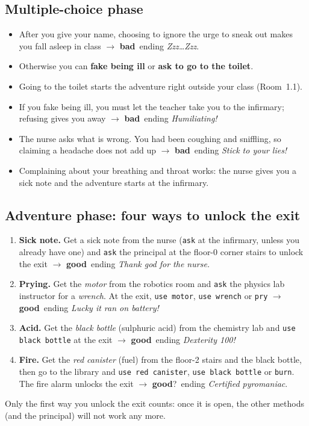 \documentclass[11pt, a4paper]{article}
\newcommand{\cmd}[1]{\texttt{#1}}
\newcommand{\good}{\textcolor{green!45!black}{\textbf{good}}}
\newcommand{\bad}{\textcolor{alarm}{\textbf{bad}}}
\begin{document}
\subsection*{Multiple-choice phase}
\begin{itemize}
  \item After you give your name, choosing to ignore the urge to sneak out makes you fall
        asleep in class $\to$ \bad\ ending \emph{Zzz\dots Zzz}.
  \item Otherwise you can \textbf{fake being ill} or \textbf{ask to go to the toilet}.
  \item Going to the toilet starts the adventure right outside your class (Room~1.1).
  \item If you fake being ill, you must let the teacher take you to the infirmary; refusing
        gives you away $\to$ \bad\ ending \emph{Humiliating!}
  \item The nurse asks what is wrong. You had been coughing and sniffling, so claiming a
        headache does not add up $\to$ \bad\ ending \emph{Stick to your lies!}
  \item Complaining about your breathing and throat works: the nurse gives you a sick note and
        the adventure starts at the infirmary.
\end{itemize}

\subsection*{Adventure phase: four ways to unlock the exit}
\begin{enumerate}
  \item \textbf{Sick note.} Get a sick note from the nurse (\cmd{ask} at the infirmary, unless
        you already have one) and \cmd{ask} the principal at the floor-0 corner stairs to unlock
        the exit $\to$ \good\ ending \emph{Thank god for the nurse.}
  \item \textbf{Prying.} Get the \emph{motor} from the robotics room and \cmd{ask} the physics lab
        instructor for a \emph{wrench}. At the exit, \cmd{use motor}, \cmd{use wrench} or
        \cmd{pry} $\to$ \good\ ending \emph{Lucky it ran on battery!}
  \item \textbf{Acid.} Get the \emph{black bottle} (sulphuric acid) from the chemistry lab and
        \cmd{use black bottle} at the exit $\to$ \good\ ending \emph{Dexterity 100!}
  \item \textbf{Fire.} Get the \emph{red canister} (fuel) from the floor-2 stairs and the black
        bottle, then go to the library and \cmd{use red canister}, \cmd{use black bottle} or
        \cmd{burn}. The fire alarm unlocks the exit $\to$ \good?\ ending \emph{Certified pyromaniac}.
\end{enumerate}
Only the first way you unlock the exit counts: once it is open, the other methods (and the
principal) will not work any more.
\end{document}
